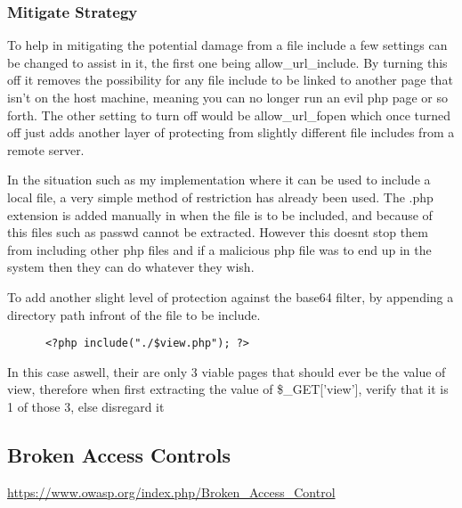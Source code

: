 \documentclass[titlepage]{article}
\begin{document}

      \subsubsection{Mitigate Strategy} %
      \label{ssub:php_file_include_mitigate_strategy}
      
      To help in mitigating the potential damage from a file include a few settings can be changed to assist in it, the first one being allow\_url\_include. By turning this off it removes the possibility for any file include to be linked to another page that isn't on the host machine, meaning you can no longer run an evil php page or so forth. The other setting to turn off would be allow\_url\_fopen which once turned off just adds another layer of protecting from slightly different file includes from a remote server. 

      In the situation such as my implementation where it can be used to include a local file, a very simple method of restriction has already been used. The .php extension is added manually in when the file is to be included, and because of this files such as passwd cannot be extracted. However this doesnt stop them from including other php files and if a malicious php file was to end up in the system then they can do whatever they wish. 

      To add another slight level of protection against the base64 filter, by appending a directory path infront of the file to be include.

      \begin{lstlisting}
      <?php include("./$view.php"); ?>
      \end{lstlisting}

      In this case aswell, their are only 3 viable pages that should ever be the value of view, therefore when first extracting the value of \$\_GET['view'], verify that it is 1 of those 3, else disregard it



   \subsection{Broken Access Controls} %
   \label{sub:broken_access_controls}

      \url{https://www.owasp.org/index.php/Broken_Access_Control}
   
\end{document}
